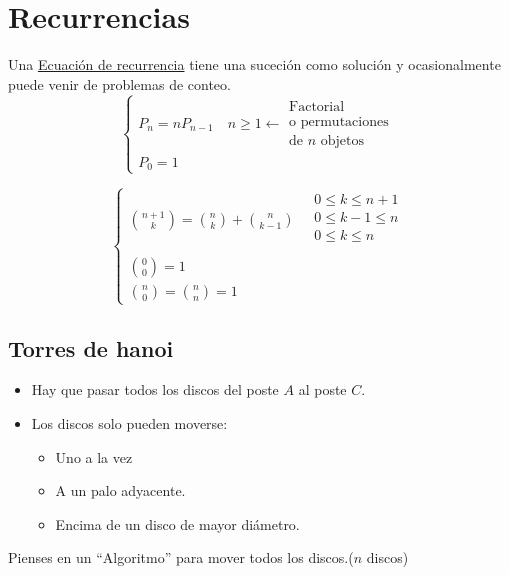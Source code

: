 \documentclass[../main.tex]{subfiles}
\begin{document}
\chapter{Recurrencias}%

\thispagestyle{fancy}


Una \underline{Ecuación de recurrencia} tiene una suceción como solución y
ocasionalmente puede venir de problemas de conteo.
\[
	\begin{cases}
		P_n=nP_{n-1}\quad n \geq 1 \longleftarrow
		\substack
		{
			\text{Factorial}\\
			\text{o permutaciones}\\
			\text{de $n$ objetos}
		}\\
		P_0=1
	\end{cases}
\]

\[
	\begin{cases}
		\binom{n+1}{k}
		=\binom{n}{k}
		+\binom{n}{k-1}\quad
		\substack
		{
			0\leq k \leq n+1\\
			0\leq k-1 \leq n\\
			0\leq k \leq n\\
		}
		\\
		\binom{0}{0}
		=1\\
		\binom{n}{0}
		=\binom{n}{n}
		=1
	\end{cases}
\]
\section{Torres de hanoi}%
\label{sec:Torres de hanoi}
\begin{itemize}
	\item Hay que pasar todos los discos del poste $A$ al poste $C$.
	\item Los discos solo pueden moverse:
		\begin{itemize}
			\item Uno a la vez
			\item A un palo adyacente.
			\item Encima de un disco de mayor diámetro.
		\end{itemize}
\end{itemize}

\begin{figure}[H]
\begin{center}
\end{center}
\end{figure}
Pienses en un ``Algoritmo'' para mover todos los discos.($n$ discos)
\end{document}
